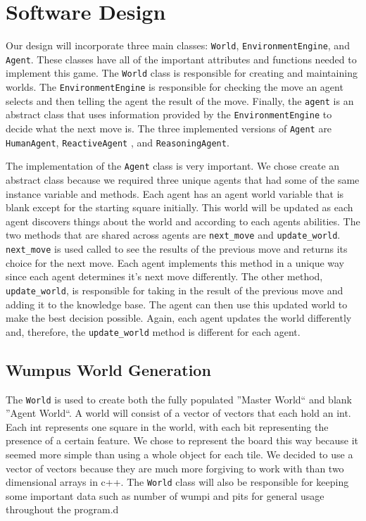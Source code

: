 \documentclass{article}
\begin{document}
	\section{Software Design}
		Our design will incorporate three main classes: \texttt{World}, \texttt{EnvironmentEngine}, and \texttt{Agent}. 
		These classes have all of the important attributes and functions needed to implement this game.
		The \texttt{World} class is responsible for creating and maintaining worlds.
		The \texttt{EnvironmentEngine} is responsible for checking the move an agent selects and then telling the agent the result of the move.
		Finally, the \texttt{agent} is an abstract class that uses information provided by the \texttt{EnvironmentEngine} to decide what the next move is. The three implemented versions of \texttt{Agent} are \texttt{HumanAgent}, \texttt{ReactiveAgent} , and \texttt{ReasoningAgent}.
		
		
		
	
		
		The implementation of the  \texttt{Agent} class is very important. 
		We chose create an abstract class because we required three unique agents that had some of the same instance variable and methods. Each agent has an agent world variable that is blank except for the starting square initially. 
		This world will be updated as each agent discovers things about the world and according to each agents abilities. 
		The two methods that are shared across agents are \texttt{next\_move} and \texttt{update\_world}. 
		\texttt{next\_move} is used called to see the results of the previous move and returns its choice for the next move. 
		Each agent implements this method in a unique way since each agent determines it's next move differently. 
		The other method, \texttt{update\_world}, is responsible for taking in the result of the previous move and adding it to the knowledge base. 
		The agent can then use this updated world to make the best decision possible. 
		Again, each agent updates the world differently and, therefore, the \texttt{update\_world} method is different for each agent.
		
	
		   
		
		\subsection{Wumpus World Generation}
		
			The \texttt{World} is used to create both the fully populated ''Master World`` and blank ''Agent World``. 
			A world will consist of a vector of vectors that each hold an int.
			Each int represents one square in the world, with each bit representing the presence of a certain feature. 
			We chose to represent the board this way because it seemed more simple than using a whole object for each tile.
			We decided to use a vector of vectors because they are much more forgiving to work with than two dimensional arrays in c++.
			The \texttt{World} class will also be responsible for keeping some important data such as number of wumpi and pits for general usage throughout the program.d 
		
\end{document}
